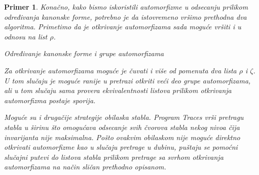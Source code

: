 \documentclass[12pt,oneside]{memoir}
\newtheorem{example}{Primer}
\theoremstyle{definition}
\begin{document}
\begin{example}
  Konačno, kako bismo iskoristili automorfizme u odsecanju prilikom određivanja
  kanonske forme, potrebno je da istovremeno vršimo prethodna dva algoritma.
  Primetimo da je otkrivanje automorfizama sada moguće vršiti i u odnosu na
  list $\rho$.

  \begin{algorithm}[H]
	  \caption{Određivanje kanonske forme i grupe automorfizama}
	  \begin{algorithmic}[1]
			\State \Return {$|\nu|$}
		  \EndIf
					\State {}
				\EndIf
			\EndIf
		  \EndFor
				\State {$\rho \gets \nu$}
			\EndIf

			\If {$\zeta = ()$}
				\State {$\zeta \gets \nu$}
			\EndIf

			\EndIf
					\State {}
				\EndIf
				\State {}
			\EndIf

		  \EndIf
		  \State \Return{$|\nu|$}
		  \EndProcedure
	  \end{algorithmic}
  \end{algorithm}

  Za otkrivanje automorfizama moguće je čuvati i više od pomenuta dva lista
  $\rho$ i $\zeta$. U tom slučaju je moguće ranije u pretrazi otkriti veći deo
  grupe automorfizama, ali u tom slučaju sama provera ekvivalentnosti listova
  prilikom otkrivanja automorfizma postaje sporija.

  Moguće su i drugačije strategije obilaska stabla. Program Traces vrši
  pretragu stabla u širinu što omogućava odsecanje svih čvorova stabla nekog
  nivoa čija invarijanta nije maksimalna. Pošto ovakvim obilaskom nije moguće
  direktno otkrivati automorfizme kao u slučaju pretrage u dubinu, puštaju se
  pomoćni slučajni putevi do listova stabla prilikom pretrage sa svrhom
  otkrivanja automorfizama na način sličan prethodno opisanom.


\end{example}
\end{document}
